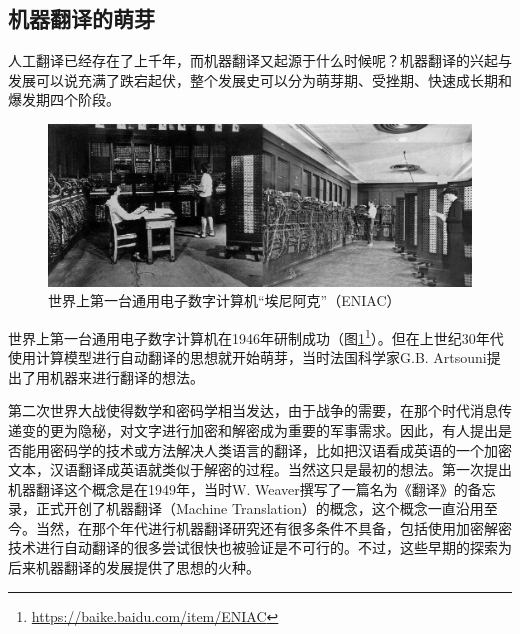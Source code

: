 
\subsection{机器翻译的萌芽}

\parinterval 人工翻译已经存在了上千年，而机器翻译又起源于什么时候呢？机器翻译的兴起与发展可以说充满了跌宕起伏，整个发展史可以分为萌芽期、受挫期、快速成长期和爆发期四个阶段。

\begin{figure}[htp]
    \centering
\includegraphics[scale=0.25]{./Chapter1/Figures/figure-eniac.jpg}
    \caption{世界上第一台通用电子数字计算机``埃尼阿克''（ENIAC）}
    \label{fig:1-4}
\end{figure}

\parinterval 世界上第一台通用电子数字计算机在1946年研制成功（图\ref{fig:1-4}\footnote{\url{https://baike.baidu.com/item/ENIAC}}）。但在上世纪30年代使用计算模型进行自动翻译的思想就开始萌芽，当时法国科学家G.B. Artsouni提出了用机器来进行翻译的想法。

\parinterval 第二次世界大战使得数学和密码学相当发达，由于战争的需要，在那个时代消息传递变的更为隐秘，对文字进行加密和解密成为重要的军事需求。因此，有人提出是否能用密码学的技术或方法解决人类语言的翻译，比如把汉语看成英语的一个加密文本，汉语翻译成英语就类似于解密的过程。当然这只是最初的想法。第一次提出机器翻译这个概念是在1949年，当时W. Weaver撰写了一篇名为《翻译》的备忘录，正式开创了机器翻译（Machine Translation）的概念，这个概念一直沿用至今。当然，在那个年代进行机器翻译研究还有很多条件不具备，包括使用加密解密技术进行自动翻译的很多尝试很快也被验证是不可行的。不过，这些早期的探索为后来机器翻译的发展提供了思想的火种。


